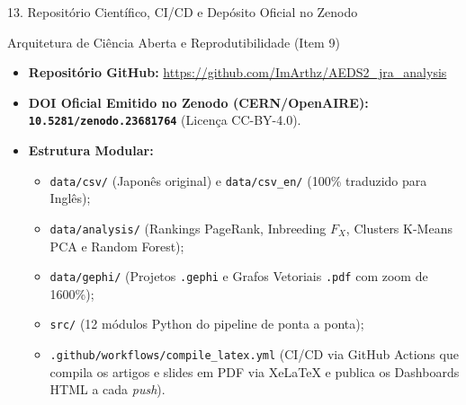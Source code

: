 \documentclass[aspectratio=169,10pt]{beamer}
\begin{document}
\begin{frame}{13. Repositório Científico, CI/CD e Depósito Oficial no Zenodo}
\begin{block}{Arquitetura de Ciência Aberta e Reprodutibilidade (Item 9)}
\begin{itemize}
    \item \textbf{Repositório GitHub:} \url{https://github.com/ImArthz/AEDS2_jra_analysis}
    \item \textbf{DOI Oficial Emitido no Zenodo (CERN/OpenAIRE):} \textbf{\texttt{10.5281/zenodo.23681764}} (Licença CC-BY-4.0).
    \item \textbf{Estrutura Modular:}
    \begin{itemize}
        \footnotesize
        \item \texttt{data/csv/} (Japonês original) e \texttt{data/csv\_en/} (100\% traduzido para Inglês);
        \item \texttt{data/analysis/} (Rankings PageRank, Inbreeding $F_X$, Clusters K-Means PCA e Random Forest);
        \item \texttt{data/gephi/} (Projetos \texttt{.gephi} e Grafos Vetoriais \texttt{.pdf} com zoom de 1600\%);
        \item \texttt{src/} (12 módulos Python do pipeline de ponta a ponta);
        \item \texttt{.github/workflows/compile\_latex.yml} (CI/CD via GitHub Actions que compila os artigos e slides em PDF via XeLaTeX e publica os Dashboards HTML a cada \textit{push}).
    \end{itemize}
\end{itemize}
\end{block}
\end{frame}
\end{document}
